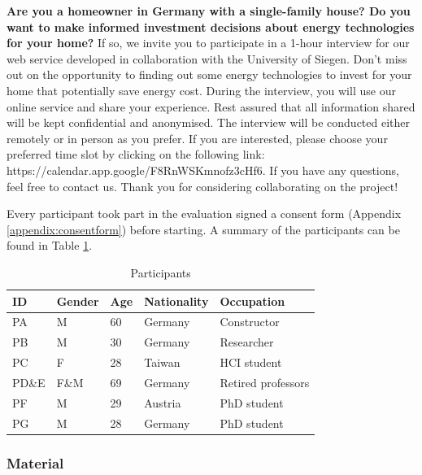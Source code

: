 \textbf{Are you a homeowner in Germany with a single-family house? 
Do you want to make informed investment decisions about energy technologies for your home? }
If so, we invite you to participate in a 1-hour interview for our web service developed in collaboration with the University of Siegen.
Don't miss out on the opportunity to finding out some energy technologies to invest for your home that potentially save energy cost. 
During the interview, you will use our online service and share your experience.
Rest assured that all information shared will be kept confidential and anonymised. 
The interview will be conducted either remotely or in person as you prefer. 
If you are interested, please choose your preferred time slot by clicking on the following link: https://calendar.app.google/F8RnWSKmnofz3cHf6. 
If you have any questions, feel free to contact us.
Thank you for considering collaborating on the project! 

Every participant took part in the evaluation signed a consent form (Appendix \ref{appendix:consentform}) before starting. 
A summary of the participants can be found in Table \ref{tab:participants}.
\begin{table}[h!]
  \centering
  \begin{tabular}{ | p{} | p{} | p{} | p{} | p{} | } 
    \hline
    ID & Gender & Age & Nationality & Occupation \\
    \hline
    PA & M & 60 & Germany & Constructor \\
    \hline
    PB & M & 30 & Germany & Researcher \\
    \hline
    PC & F & 28 & Taiwan & HCI student \\
    \hline
    PD\&E & F\&M & 69 & Germany & Retired professors \\
    \hline
    PF & M & 29 & Austria & PhD student \\
    \hline
    PG & M & 28 & Germany & PhD student \\
    \hline
  \end{tabular}
  \caption{Participants}
  \label{tab:participants}
\end{table}


\subsubsection{Material}

